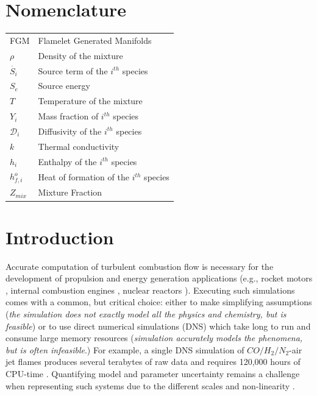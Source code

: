 \documentclass[conf]{new-aiaa}
\begin{document}
\section{Nomenclature}
{\renewcommand\arraystretch{1.0}
\noindent\begin{longtable*}{@{}l @{\quad=\quad} l@{}}
FGM & Flamelet Generated Manifolds \\
$\rho$ & Density of the mixture \\
$\dot{S_i}$ & Source term of the $i^{th}$ species \\
$S_e$ & Source energy \\
$T$ & Temperature of the mixture \\
$Y_i$ & Mass fraction of $i^{th}$ species \\
$\mathcal{D}_i$ & Diffusivity of the $i^{th}$ species \\
$k$ & Thermal conductivity \\
$h_i$ & Enthalpy of the $i^{th}$ species \\
$h_{f,i}^o$ & Heat of formation of the $i^{th}$ species \\
$Z_{mix}$ & Mixture Fraction
\end{longtable*}}

 


\section{Introduction}
Accurate computation of turbulent combustion flow is necessary for the development of propulsion and energy generation applications (e.g., rocket motors \cite{dnssolid} \cite{ablate}, internal combustion engines \cite{iceles}, nuclear reactors \cite{nuclear}). Executing such simulations comes with a common, but critical choice: either to make simplifying assumptions \cite{GONZALEZJUEZ201726} (\textit{the simulation does not exactly model all the physics and chemistry, but is feasible}) or to use direct numerical simulations (DNS) which take long to run and consume large memory resources (\textit{simulation accurately models the phenomena, but is often infeasible}.) For example, a single DNS simulation of $CO/H_2/N_2$-air jet flames produces several terabytes of raw data and requires 120,000 hours of CPU-time \cite{Hawkes_2005}. Quantifying model and parameter uncertainty remains a challenge when representing such systems due to the different scales and non-linearity \cite{uqturb1} \cite{MUELLER2018137} \cite{JI20192175}.  
\end{document}
